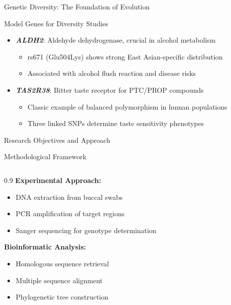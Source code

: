 \documentclass[10pt,hyperref={colorlinks,citecolor=blue,urlcolor=peking_blue,linkcolor=}]{beamer}
\theoremstyle{plain}
\begin{document}
\begin{frame}{Genetic Diversity: The Foundation of Evolution}
    \begin{block}{Model Genes for Diversity Studies}
        \begin{itemize}
            \item \textbf{\textit{ALDH2}}: Aldehyde dehydrogenase, crucial in alcohol metabolism
            \begin{itemize}
                \item rs671 (Glu504Lys) shows strong East Asian-specific distribution
                \item Associated with alcohol flush reaction and disease risks
            \end{itemize}
            \item \textbf{\textit{TAS2R38}}: Bitter taste receptor for PTC/PROP compounds
            \begin{itemize}
                \item Classic example of balanced polymorphism in human populations
                \item Three linked SNPs determine taste sensitivity phenotypes
            \end{itemize}
        \end{itemize}
    \end{block}
\end{frame}

\begin{frame}{Research Objectives and Approach}
    \begin{block}{Methodological Framework}
        \vspace{-0.7em}
        \hspace{0.4em}
        \begin{columns}
            \begin{column}{0.9\textwidth}
                \textbf{Experimental Approach:}
                \begin{itemize}
                    \item DNA extraction from buccal swabs
                    \item PCR amplification of target regions
                    \item Sanger sequencing for genotype determination
                \end{itemize}

                \textbf{Bioinformatic Analysis:}
                \begin{itemize}
                    \item Homologous sequence retrieval
                    \item Multiple sequence alignment
                    \item Phylogenetic tree construction
                \end{itemize}
            \end{column}
        \end{columns}
        \hspace{1em}
    \end{block}
\end{frame}
\end{document}
